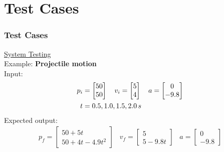 \documentclass{beamer}
\begin{document}

\section[Tests]{Test Cases}


\begin{frame}
	
\frametitle{Test Cases}

\underline{System Testing} \\
\vspace{5pt}
Example: \textbf{Projectile motion} \\
\vspace{5pt}
Input: 
\begin{align*}
p_i & = \begin{bmatrix}
50 \\
50
\end{bmatrix}
\hspace{10pt}
v_i = \begin{bmatrix}
5 \\
4
\end{bmatrix}
\hspace{10pt}
a = \begin{bmatrix}
0 \\
-9.8
\end{bmatrix} \\
\vspace{10pt}
t & = 0.5, 1.0, 1.5, 2.0 \,s
\end{align*}
Expected output: 
\begin{align*}
p_f = \begin{bmatrix}
50 + 5t \\
50 + 4t - 4.9t^2
\end{bmatrix}
\hspace{10pt}
v_f = \begin{bmatrix}
5 \\
5 - 9.8t
\end{bmatrix}
\hspace{10pt}
a = \begin{bmatrix}
0 \\
-9.8
\end{bmatrix}
\end{align*}

\end{frame}

\end{document}
